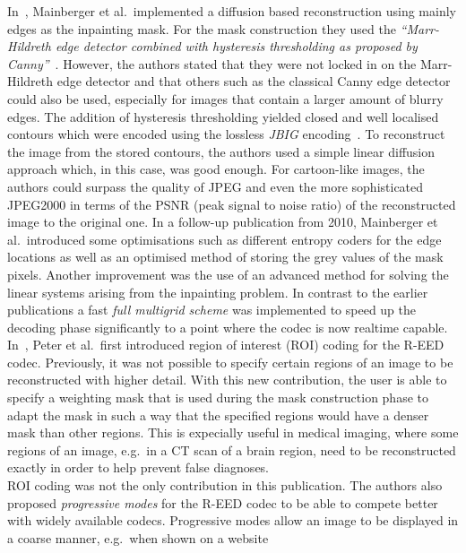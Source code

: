 \noindent In~\cite{mainberger09, mainberger10}, Mainberger et al.\ implemented a diffusion based reconstruction
using mainly edges as the inpainting mask. For the mask construction they used the \textit{\enquote{Marr-Hildreth
edge detector combined with hysteresis thresholding as proposed by
Canny}}~\cite{mainberger09}.
However, the authors stated that they were not locked in on the Marr-Hildreth edge detector and that
others such as the classical Canny edge detector could also be used, especially for images that
contain a larger amount of blurry edges. The addition of hysteresis thresholding yielded closed and
well localised contours which were encoded using the lossless \textit{JBIG} encoding~\cite{jbig}.
To reconstruct the image from the stored contours, the authors used a simple linear diffusion approach
which, in this case, was good enough. For cartoon-like images, the authors could surpass the quality of
JPEG and even the more sophisticated JPEG2000 in terms of the PSNR (peak signal to noise ratio) 
of the reconstructed image to the original one. 
In a follow-up publication from 2010, Mainberger et al.\ introduced some optimisations such 
as different entropy coders for the edge locations as well as an optimised method of storing the grey
values of the mask pixels. Another improvement was the use of an advanced method for solving the
linear systems arising from the inpainting problem. In contrast to the earlier publications a fast
\textit{full multigrid scheme} was implemented to speed up the decoding phase significantly to 
a point where the codec is now realtime capable.\\
\newpage\noindent
In~\cite{peter15}, Peter et al.\ first introduced region of interest (ROI) coding for the R-EED codec. 
Previously,
it was not possible to specify certain regions of an image to be reconstructed with higher detail.
With this new contribution, the user is able to specify a weighting mask that is used during
the mask construction phase to adapt the mask in such a way that the specified regions would have a
denser mask than other regions. This is expecially useful in medical imaging, where some regions of
an image, e.g.\ in a CT scan of a brain region, need to be reconstructed exactly in order to help 
prevent false diagnoses. \\
ROI coding was not the only contribution in this publication. The authors also proposed
\textit{progressive modes} for the R-EED codec to be able to compete better with widely available codecs.
Progressive modes allow an image to be displayed in a coarse manner, e.g.\ when shown on a website
